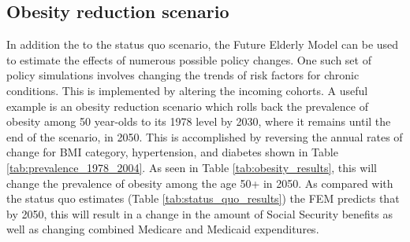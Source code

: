 \subsection{Obesity reduction scenario}
In addition the to the status quo scenario, the Future Elderly Model can be 
used to estimate the effects of numerous possible policy changes. One such set 
of policy simulations involves changing the trends of risk factors for chronic 
conditions. This is implemented by altering the incoming cohorts. A useful 
example is an obesity reduction scenario which rolls back the prevalence of 
obesity among 50 year-olds to its 1978 level by 2030, where it remains until 
the end of the scenario, in 2050. This is accomplished by reversing the annual
rates of change for BMI category, hypertension, and diabetes shown in Table 
\ref{tab:prevalence_1978_2004}.  As seen in Table \ref{tab:obesity_results}, 
this will change the prevalence of obesity among the age 50+ in 2050. As 
compared with the status quo estimates (Table \ref{tab:status_quo_results}) the 
FEM predicts that by 2050, this will result in a change in the amount of Social 
Security benefits as well as changing combined Medicare and Medicaid expenditures.

